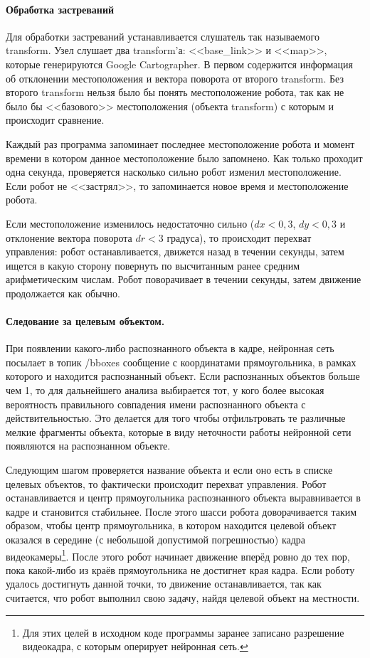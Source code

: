 \paragraph{Обработка застреваний}
Для обработки застреваний устанавливается слушатель так называемого transform. Узел слушает два transform'а: <<base\_link>> и <<map>>, которые генерируются Google Cartographer. В первом содержится информация об отклонении местоположения и вектора поворота от второго transform. Без второго transform нельзя было бы понять местоположение робота, так как не было бы <<базового>> местоположения (объекта transform) с которым и происходит сравнение. 

Каждый раз программа запоминает последнее местоположение робота и момент времени в котором данное местоположение было запомнено. Как только проходит одна секунда, проверяется насколько сильно робот изменил местоположение. Если робот не <<застрял>>, то запоминается новое время и местоположение робота. 

Если местоположение изменилось недостаточно сильно ($dx < 0,3$, $dy < 0,3$ и отклонение вектора поворота $dr < 3$ градуса), то происходит перехват управления: робот останавливается, движется назад в течении секунды, затем ищется в какую сторону повернуть по высчитанным ранее средним арифметическим числам. Робот поворачивает в течении секунды, затем движение продолжается как обычно. 

\paragraph{Следование за целевым объектом.} При появлении какого-либо распознанного объекта в кадре, нейронная сеть посылает в топик /bboxes сообщение с координатами прямоугольника, в рамках которого и находится распознанный объект. Если распознанных объектов больше чем 1, то для дальнейшего анализа выбирается тот, у кого более высокая вероятность правильного совпадения имени распознанного объекта с действительностью. Это делается для того чтобы отфильтровать те различные мелкие фрагменты объекта, которые в виду неточности работы нейронной сети появляются на распознанном объекте.

Следующим шагом проверяется название объекта и если оно есть в списке целевых объектов, то фактически происходит перехват управления. Робот останавливается и центр прямоугольника распознанного объекта выравнивается в кадре и становится стабильнее. После этого шасси робота доворачивается таким образом, чтобы центр прямоугольника, в котором находится целевой объект оказался в середине (с небольшой допустимой погрешностью) кадра видеокамеры\footnote{Для этих целей в исходном коде программы заранее записано разрешение видеокадра, с которым оперирует нейронная сеть.}. После этого робот начинает движение вперёд ровно до тех пор, пока какой-либо из краёв прямоугольника не достигнет края кадра. Если роботу удалось достигнуть данной точки, то движение останавливается, так как считается, что робот выполнил свою задачу, найдя целевой объект на местности. 

